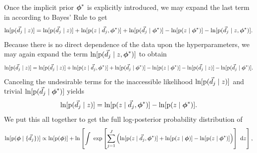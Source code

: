 Once the implicit prior ${\boldsymbol{\phi}}^{*}$ is explicitly introduced, we may expand the last term in  according to Bayes' Rule to get 
\begin{equation}
\eqlabel{eqn:expand}
\ln[\pr{\data_{j} \gvn z}] = \ln[\pr{\data_{j} \gvn z}] + \ln[\pr{z \gvn \data_{j}, \ndphi^{*}}] + \ln[\pr{\data_{j} \gvn \ndphi^{*}}] - \ln[\pr{z \gvn \ndphi^{*}}] - \ln[\pr{\data_{j} \gvn z, \ndphi^{*}}].
\end{equation}
Because there is no direct dependence of the data upon the hyperparameters, we may again expand the term $\ln[\mathrm{p}(\vec{d}_{j} \mid z, {\boldsymbol{\phi}}^{*})]$ to obtain 
\begin{equation}
\eqlabel{eqn:indterm}
\ln[\pr{\vec{d}_{j} \gvn z}] = \ln[\pr{\data_{j} \gvn z}] + \ln[\pr{z \gvn \data_{j}, \ndphi^{*}}] + \ln[\pr{\data_{j} \gvn \ndphi^{*}}] - \ln[\pr{z \gvn \ndphi^{*}}] - \ln[\pr{\data_{j} \gvn z}] - \ln[\pr{\data_{j} \gvn \ndphi^{*}}].
\end{equation}
Canceling the undesirable terms for the inaccessible likelihood $\ln[\mathrm{p}(\vec{d}_{j} \mid z)]$ and trivial $\ln[\mathrm{p}(\vec{d}_{j} \mid {\ensuremath{\boldsymbol{\phi}}}^{*})]$ yields
\begin{equation}
\eqlabel{eqn:cancel}
\ln[\pr{\data_{j} \gvn z}] = \ln[\pr{z \gvn \data_{j}, \ndphi^{*}}]  - \ln[\pr{z \gvn \ndphi^{*}}].
\end{equation}
We put this all together to get the full log-posterior probability distribution of 
\begin{equation}
\eqlabel{eqn:final}
\ln[\pr{\ndphi \gvn \{\data_{j}\}}] \propto \ln[\pr{\ndphi}] + \ln \left[\integral{\exp \left[\sum_{j=1}^{J} \left(\ln[\pr{z \gvn \data_{j}, \ndphi^{*}}] + \ln[\pr{z \gvn \ndphi}] - \ln[\pr{z \gvn \ndphi^{*}}]\right)\right]}{z}\right] ,
\end{equation}

